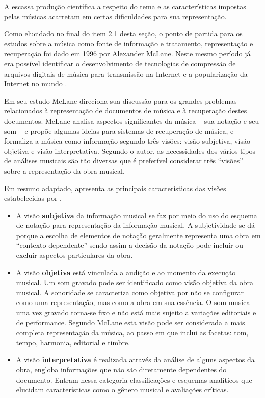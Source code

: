 A escassa produção científica a respeito do tema e as características impostas pelas músicas acarretam em certas dificuldades para sua representação.

Como elucidado no final do item 2.1 desta seção, o ponto de partida para os estudos sobre a música como fonte de informação e tratamento, representação e recuperação foi dado em 1996 por Alexander McLane. Neste mesmo período já era possível identificar o desenvolvimento de tecnologias de compressão de arquivos digitais de música para transmissão na Internet e a popularização da Internet no mundo \cite{santini&souza2007}.

Em seu estudo McLane direciona sua discussão para os grandes problemas relacionados à representação de documentos de música e à recuperação destes documentos. McLane analisa aspectos significantes da música – sua notação e seu som – e propõe algumas ideias para sistemas de recuperação de música, e formaliza a música como informação segundo três visões: visão subjetiva, visão objetiva e visão interpretativa. Segundo o autor, as necessidades dos vários tipos de análises musicais são tão diversas que é preferível considerar três “visões” sobre a representação da obra musical.

Em resumo adaptado,  apresenta as principais características das visões estabelecidas por .

\begin{itemize}
    \item A visão \textbf{subjetiva} da informação musical se faz por meio do uso do esquema de notação para representação da informação musical. A subjetividade se dá porque a escolha de elementos de notação geralmente representa uma obra em “contexto-dependente” sendo assim a decisão da notação pode incluir ou excluir aspectos particulares da obra.
    \item A visão \textbf{objetiva} está vinculada a audição e ao momento da execução musical. Um som gravado pode ser identificado como visão objetiva da obra musical. A sonoridade se caracteriza como objetiva por não se configurar como uma representação, mas como a obra em sua essência. O som musical uma vez gravado torna-se fixo e não está mais sujeito a variações editoriais e de performance. Segundo McLane esta visão pode ser considerada a mais completa representação da música, ao passo em que inclui as facetas: tom, tempo, harmonia, editorial e timbre.
    \item A visão \textbf{interpretativa} é realizada através da análise de alguns aspectos da obra, engloba informações que não são diretamente dependentes do documento. Entram nessa categoria classificações e esquemas analíticos que elucidam características como o gênero musical e avaliações críticas.
\end{itemize}

